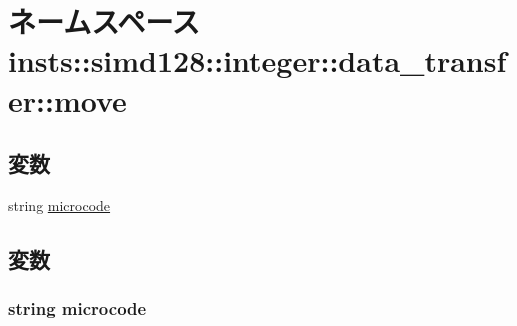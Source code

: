 \hypertarget{namespaceinsts_1_1simd128_1_1integer_1_1data__transfer_1_1move}{
\section{ネームスペース insts::simd128::integer::data\_\-transfer::move}
\label{namespaceinsts_1_1simd128_1_1integer_1_1data__transfer_1_1move}
}
\subsection*{変数}
\begin{DoxyCompactItemize}
\item 
string \hyperlink{namespaceinsts_1_1simd128_1_1integer_1_1data__transfer_1_1move_a770f11a173e99389a8802f0107ed8f52}{microcode}
\end{DoxyCompactItemize}


\subsection{変数}
\hypertarget{namespaceinsts_1_1simd128_1_1integer_1_1data__transfer_1_1move_a770f11a173e99389a8802f0107ed8f52}{
\subsubsection[{microcode}]{\setlength{\rightskip}{0pt plus 5cm}string {\bf microcode}}}
\label{namespaceinsts_1_1simd128_1_1integer_1_1data__transfer_1_1move_a770f11a173e99389a8802f0107ed8f52}
